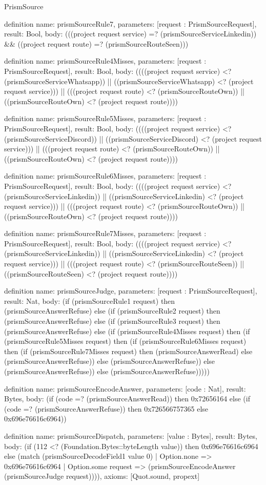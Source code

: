 \begin{lexlean}{PrismSource}
\begin{semanticmodule}
definition{
  name: prismSourceRule7,
  parameters: [request : PrismSourceRequest],
  result: Bool,
  body: (((project request service) =? (prismSourceServiceLinkedin)) && ((project request route) =? (prismSourceRouteSeen)))
}

definition{
  name: prismSourceRule4Misses,
  parameters: [request : PrismSourceRequest],
  result: Bool,
  body: ((((project request service) <? (prismSourceServiceWhatsapp)) || ((prismSourceServiceWhatsapp) <? (project request service))) || (((project request route) <? (prismSourceRouteOwn)) || ((prismSourceRouteOwn) <? (project request route))))
}

definition{
  name: prismSourceRule5Misses,
  parameters: [request : PrismSourceRequest],
  result: Bool,
  body: ((((project request service) <? (prismSourceServiceDiscord)) || ((prismSourceServiceDiscord) <? (project request service))) || (((project request route) <? (prismSourceRouteOwn)) || ((prismSourceRouteOwn) <? (project request route))))
}

definition{
  name: prismSourceRule6Misses,
  parameters: [request : PrismSourceRequest],
  result: Bool,
  body: ((((project request service) <? (prismSourceServiceLinkedin)) || ((prismSourceServiceLinkedin) <? (project request service))) || (((project request route) <? (prismSourceRouteOwn)) || ((prismSourceRouteOwn) <? (project request route))))
}

definition{
  name: prismSourceRule7Misses,
  parameters: [request : PrismSourceRequest],
  result: Bool,
  body: ((((project request service) <? (prismSourceServiceLinkedin)) || ((prismSourceServiceLinkedin) <? (project request service))) || (((project request route) <? (prismSourceRouteSeen)) || ((prismSourceRouteSeen) <? (project request route))))
}

definition{
  name: prismSourceJudge,
  parameters: [request : PrismSourceRequest],
  result: Nat,
  body: (if (prismSourceRule1 request) then (prismSourceAnswerRefuse) else (if (prismSourceRule2 request) then (prismSourceAnswerRefuse) else (if (prismSourceRule3 request) then (prismSourceAnswerRefuse) else (if (prismSourceRule4Misses request) then (if (prismSourceRule5Misses request) then (if (prismSourceRule6Misses request) then (if (prismSourceRule7Misses request) then (prismSourceAnswerRead) else (prismSourceAnswerRefuse)) else (prismSourceAnswerRefuse)) else (prismSourceAnswerRefuse)) else (prismSourceAnswerRefuse)))))
}

definition{
  name: prismSourceEncodeAnswer,
  parameters: [code : Nat],
  result: Bytes,
  body: (if (code =? (prismSourceAnswerRead)) then 0x72656164 else (if (code =? (prismSourceAnswerRefuse)) then 0x726566757365 else 0x696e76616c6964))
}

definition{
  name: prismSourceDispatch,
  parameters: [value : Bytes],
  result: Bytes,
  body: (if (112 <? (Foundation.Bytes::byteLength value)) then 0x696e76616c6964 else (match (prismSourceDecodeField1 value 0)
    | Option.none => 0x696e76616c6964
    | Option.some request => (prismSourceEncodeAnswer (prismSourceJudge request)))),
  axioms: [Quot.sound, propext]
}
\end{semanticmodule}
\end{lexlean}
